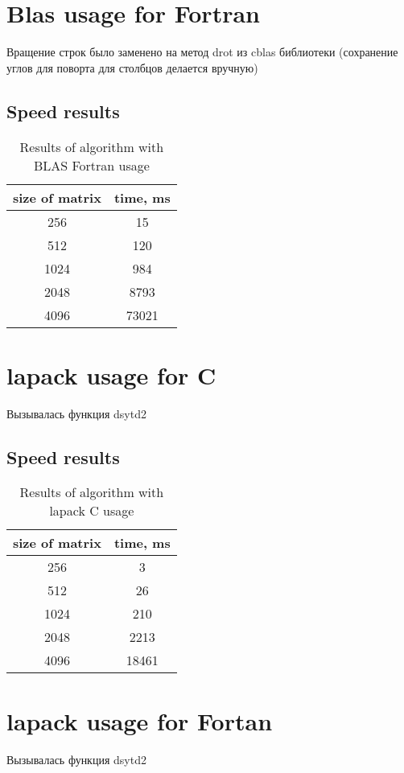 \documentclass[12pt]{report}
\begin{document}
	\chapter{Blas usage for Fortran}
	Вращение строк было заменено на метод drot из cblas библиотеки (сохранение углов для поворта для столбцов делается вручную)

	\section{Speed results}
	\begin{table}[h!]
		\centering
		\begin{tabular}{ | c | c | }
			\hline
			size of matrix & time, ms\\  [0.5ex]
			\hline\hline
			256 & 15 \\
			\hline
			512 & 120 \\
			\hline
			1024 & 984 \\
			\hline
			2048 & 8793 \\
			\hline
			4096 & 73021 \\
			\hline
		\end{tabular}
		\caption{Results of algorithm with BLAS Fortran usage}
	\end{table}

	\chapter{lapack usage for C}
	Вызывалась функция dsytd2
	\section{Speed results}
	\begin{table}[h!]
		\centering
		\begin{tabular}{ | c | c | }
			\hline
			size of matrix & time, ms\\  [0.5ex]
			\hline\hline
			256 & 3 \\
			\hline
			512 & 26 \\
			\hline
			1024 & 210 \\
			\hline
			2048 & 2213 \\
			\hline
			4096 & 18461 \\
			\hline
		\end{tabular}
		\caption{Results of algorithm with lapack C usage}
	\end{table}

	\chapter{lapack usage for Fortan}
	Вызывалась функция dsytd2
\end{document}
